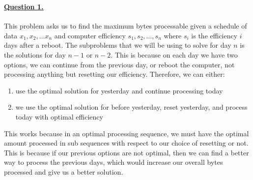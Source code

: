 \documentclass[12pt]{article}
\begin{document}
\hyperlink{toc}{\hypertarget{1}{\LARGE \underline{\textbf{Question 1.}}}}\\\\
This problem asks us to find the maximum bytes processable given a schedule of data $x_1, x_2, \ldots x_n$ and computer efficiency
$s_1, s_2, \ldots, s_n$ where $s_i$ is the efficiency $i$ days after a reboot. The subproblems that we will be using to
solve for day $n$ is the solutions for day $n-1$ or $n-2$. This is because on each day we have two options, we can continue from the previous day,
or reboot the computer, not processing anything but resetting our efficiency. Therefore, we can either:
\begin{enumerate}
	\item use the optimal solution for yesterday and continue processing today
	\item we use the optimal solution for before yesterday, reset yesterday, and process today with optimal efficiency
\end{enumerate}
This works because in an optimal processing sequence, we must have the optimal amount processed in sub sequences
with respect to our choice of resetting or not. This is because if our previous options are not optimal, then we
can find a better way to process the previous days, which would increase our overall bytes processed and give us a better solution.
\end{document}
